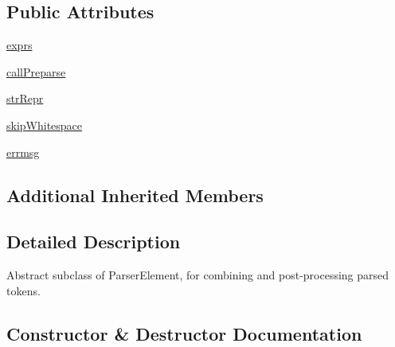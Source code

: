 \subsection*{Public Attributes}
\begin{DoxyCompactItemize}
\item 
\hyperlink{classpkg__resources_1_1__vendor_1_1pyparsing_1_1ParseExpression_ae9e07a06d183190717e964e7ff907363}{exprs}
\item 
\hyperlink{classpkg__resources_1_1__vendor_1_1pyparsing_1_1ParseExpression_ae3f6313cd22d32d51cce032f55a5aa33}{call\+Preparse}
\item 
\hyperlink{classpkg__resources_1_1__vendor_1_1pyparsing_1_1ParseExpression_a0cfce95a34e588692286483d95450df7}{str\+Repr}
\item 
\hyperlink{classpkg__resources_1_1__vendor_1_1pyparsing_1_1ParseExpression_a21811d605b31df5c68dc3db16e0dc3e2}{skip\+Whitespace}
\item 
\hyperlink{classpkg__resources_1_1__vendor_1_1pyparsing_1_1ParseExpression_a91ef46b1164f57d4f3abf7a1d37a8ecf}{errmsg}
\end{DoxyCompactItemize}
\subsection*{Additional Inherited Members}


\subsection{Detailed Description}
\begin{DoxyVerb}Abstract subclass of ParserElement, for combining and post-processing parsed tokens.
\end{DoxyVerb}
 

\subsection{Constructor \& Destructor Documentation}
\mbox{\label{classpkg__resources_1_1__vendor_1_1pyparsing_1_1ParseExpression_a5043898cb91712fba96512b0cf7e451c}} 
